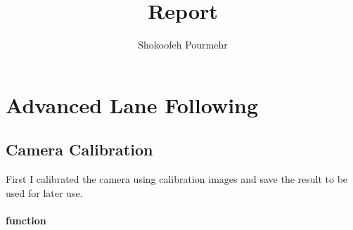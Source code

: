 \documentclass[12pt,a4paper,onecolumn]{report}
\title{Report}
\begin{document}
\author{Shokoofeh Pourmehr}
\chapter*{Advanced Lane Following}
\section*{Camera Calibration}
First I calibrated the camera using calibration images and save the result to be used for later use. 
\subsubsection*{function}
\end{document}
